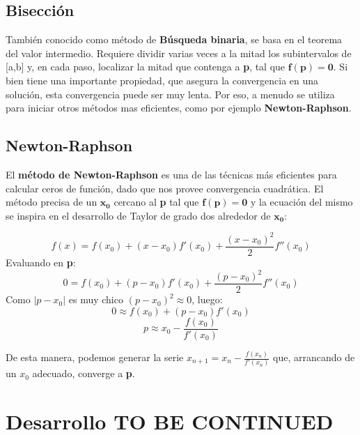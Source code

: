 \documentclass[a4paper]{article}
\begin{document}
\subsection{Bisección}
También conocido como método de \textbf{Búsqueda binaria}, se basa en el teorema del valor intermedio. 
Requiere dividir varias veces a la mitad los subintervalos de [a,b] y, en cada paso, localizar la mitad que 
contenga a \textbf{p}, tal que $\mathbf{f(p) = 0}$.
Si bien tiene una importante propiedad, que asegura la convergencia en una solución, 
esta convergencia puede ser muy lenta. 
Por eso, a menudo se utiliza para iniciar otros métodos mas eficientes, como por ejemplo \textbf{Newton-Raphson}.

\subsection{Newton-Raphson}
El \textbf{método de Newton-Raphson} es una de las técnicas más eficientes para calcular ceros de función,
dado que nos provee convergencia cuadrática. El método precisa de un $\mathbf{x_0}$ cercano 
al \textbf{p} tal que $\mathbf{f(p) = 0}$ y la ecuación del mismo se inspira en el desarrollo de
Taylor de grado dos alrededor de $\mathbf{x_0}$:

$$f(x) = f(x_0) + (x - x_0)f'(x_0) + \frac{(x - x_0)^2}{2}f''(x_0)$$
Evaluando en \textbf{p}:
$$0 = f(x_0) + (p - x_0)f'(x_0) + \frac{(p - x_0)^2}{2}f''(x_0)$$
Como  $|p - x_0|$ es muy chico $(p - x_0)^2 \approx 0$, luego:  
$$0 \approx f(x_0) + (p - x_0)f'(x_0)$$
$$p \approx x_0 - \frac{f(x_0)}{f'(x_0)}$$

De esta manera, podemos generar la serie $x_{n + 1} = x_n - \frac{f(x_n)}{f'(x_n)}$ que, arrancando de un $x_0$ adecuado, converge a \textbf{p}.


\section{Desarrollo TO BE CONTINUED}
\end{document}
